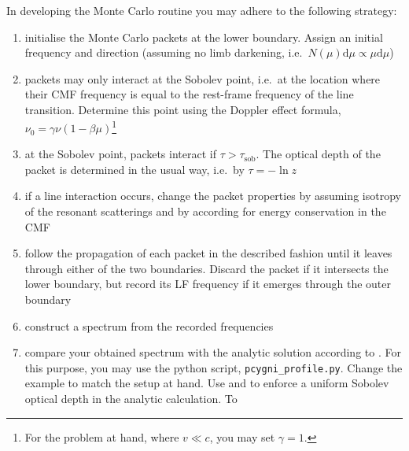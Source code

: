 \documentclass[12pt,a4paper,twoside]{article}
\begin{document}
\begin{enumerate}
  In developing the Monte Carlo routine you may adhere to the following
  strategy:
  \begin{enumerate}
    \item initialise the Monte Carlo packets at the lower boundary. Assign an
      initial frequency and direction (assuming no limb darkening, i.e.\ $N(\mu)
      \mathrm{d} \mu \propto \mu \mathrm{d}\mu$)
    \item packets may only interact at the Sobolev point, i.e.\ at the location
      where their CMF frequency is equal to the rest-frame frequency of the line
      transition. Determine this point using the Doppler effect formula, $\nu_0 =
      \gamma \nu (1 - \beta \mu)$\footnote{For the problem at hand, where $v \ll
      c$, you may set $\gamma = 1$.}
    \item at the Sobolev point, packets interact if $\tau >
      \tau_{\mathrm{sob}}$. The optical depth of the packet is determined in the
      usual way, i.e.\ by $\tau = - \ln z$
    \item if a line interaction occurs, change the packet properties by assuming
      isotropy of the resonant scatterings and by according for 
      energy conservation in the CMF 
    \item follow the propagation of each packet in the described fashion until
      it leaves through either of the two boundaries. Discard the packet if it
      intersects the lower boundary, but record its LF frequency if it emerges
      through the outer boundary
    \item construct a spectrum from the recorded frequencies

    \item compare your obtained spectrum with the analytic solution according to
      \citet{Jeffery1990}. For this purpose, you may use the python script,
      \texttt{pcygni_profile.py}. Change the example to match the setup at hand.
      Use \texttt{} and \texttt{} to enforce a uniform Sobolev optical depth in
      the analytic calculation. To  
  \end{enumerate}
\end{enumerate}
\end{document}
